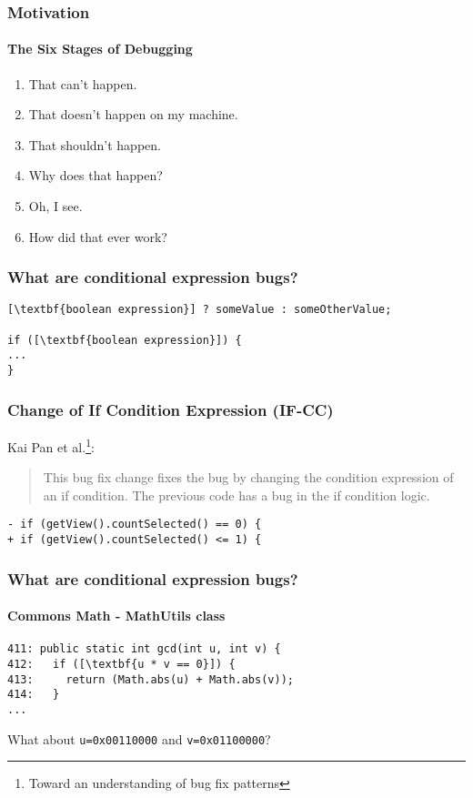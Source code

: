  
\begin{frame}
\frametitle{Motivation}
\framesubtitle{The Six Stages of Debugging}
\begin{enumerate}
\item  That can’t happen.
\item  That doesn’t happen on my machine.
\item  That shouldn’t happen.
\item  Why does that happen?
\item  Oh, I see.
\item  How did that ever work?
\end{enumerate}
\end{frame}

 
 
\begin{frame}[fragile]
\frametitle{What are conditional expression bugs?}
\begin{lstlisting}[escapeinside=\[\]]
[\textbf{boolean expression}] ? someValue : someOtherValue;

if ([\textbf{boolean expression}]) {
...
}
\end{lstlisting}
\end{frame}

\begin{frame}[fragile]
\frametitle{Change of If Condition Expression (IF-CC)}
Kai Pan et al.\footnote{Toward an understanding of bug fix patterns}:
\begin{quotation}
This bug fix change fixes the bug by changing the condition expression of an if
condition. The previous code has a bug in the if condition logic.
\end{quotation}

\vspace{1em}

\begin{lstlisting}
- if (getView().countSelected() == 0) {
+ if (getView().countSelected() <= 1) {
\end{lstlisting}
\end{frame}
  
\begin{frame}[fragile]
\frametitle{What are conditional expression bugs?}
\framesubtitle{Commons Math - MathUtils class}
    
\begin{lstlisting}[escapeinside=\[\]]
411: public static int gcd(int u, int v) {
412:   if ([\textbf{u * v == 0}]) {
413:     return (Math.abs(u) + Math.abs(v));
414:   }
...
\end{lstlisting}

\vspace{2em}

\centering What about \texttt{u=0x00110000} and  \texttt{v=0x01100000}?

\end{frame}

